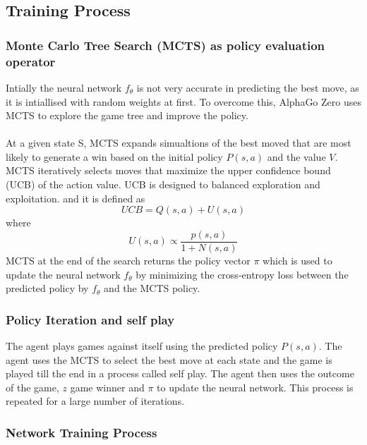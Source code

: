 \subsection{Training Process}

\subsubsection{Monte Carlo Tree Search (MCTS) as policy evaluation operator} 
Intially the neural network \( f_\theta \) is not very accurate in predicting the best move, as it is intiallised with random weights at first. To overcome this, AlphaGo Zero uses MCTS to explore the game tree and improve the policy. 
\\\\
At a given state S, MCTS expands simualtions of the best moved that are most likely to generate a win based on the initial policy $P(s,a)$ and the value $V$. MCTS iteratively selects moves that maximize the upper confidence bound (UCB) of the action value. UCB is designed to balanced exploration and exploitation. and it is defined as \[ UCB = Q(s, a) + U(s, a)\] where \[U(s, a) \propto \frac{p(s, a)}{1 + N(s, a)}\] MCTS at the end of the search returns the policy vector \( \pi \) which is used to update the neural network \( f_\theta \) by minimizing the cross-entropy loss between the predicted policy by $f_\theta$ and the MCTS policy.

\subsubsection{Policy Iteration and self play} 
The agent plays games against itself using the predicted policy $P(s, a)$. The agent uses the MCTS to select the best move at each state and the game is played till the end in a process called self play. The agent then uses the outcome of the game, $z$ game winner and $\pi$ to update the neural network. This process is repeated for a large number of iterations.

\subsubsection{Network Training Process} 

